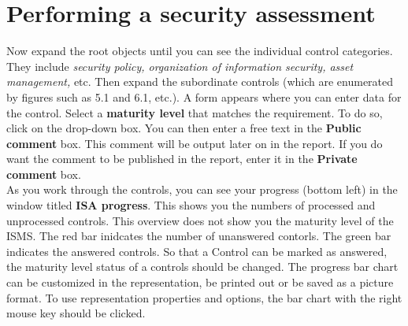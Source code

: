 \documentclass[a4paper,10pt]{book}
\begin{document}
\section{Performing a security assessment}
Now expand the root objects until you can see the individual control categories. They include {\em security policy, organization of information security, asset management,}
etc. Then expand the subordinate controls (which are enumerated by figures such as 5.1 and 6.1, etc.). A form appears where you can enter data for the control. Select a
\textbf{maturity level} that matches the requirement. To do so, click on the drop-down box. You can then enter a free text in the
\textbf{Public comment} box. This comment will be output later on in the report. If you do want the comment to be published in the report, enter it in the
\textbf{Private comment} box.
\newline\\
As you work through the controls, you can see your progress (bottom left) in the window titled \textbf{ISA progress}.
This shows you the numbers of processed and unprocessed controls. This overview does not show you the maturity level of the ISMS.
The red bar inidcates the number of unanswered contorls. The green bar indicates the answered controls. So that a Control can be marked as answered,
the maturity level status of a controls should be changed. The progress bar chart can be customized in the representation, be printed out or be saved as a picture format.
To use representation properties and options, the bar chart with the right mouse key should be clicked.
\end{document}
